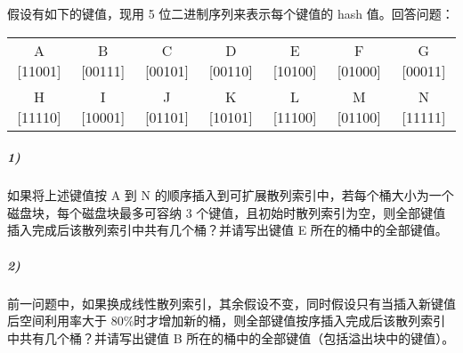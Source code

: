 \documentclass{article}
\makeatletter
\renewcommand{\section}{\@startsection{section}{1}{0mm}
                                {-5ex plus -.5ex minus -.2ex}
                                {3ex plus .2ex}
                                {\normalfont\large\bfseries}}
\makeatother
\begin{document}
\section{假设有如下的键值，现用 5 位二进制序列来表示每个键值的 hash 值。回答问题：}
\begin{table}[h]
    \centering
    \begin{tabular}{ccccccc}
        A [11001] & B [00111] & C [00101] & D [00110] & E [10100] & F [01000] & G [00011] \\
        H [11110] & I [10001] & J [01101] & K [10101] & L [11100] & M [01100] & N [11111]
    \end{tabular}
\end{table}
\subparagraph{1)} 如果将上述键值按 A 到 N 的顺序插入到可扩展散列索引中，若每个桶大小为一个磁盘块，每个磁盘块最多可容纳 3 个键值，且初始时散列索引为空，则全部键值插入完成后该散列索引中共有几个桶？并请写出键值 E 所在的桶中的全部键值。
\subparagraph{2)} 前一问题中，如果换成线性散列索引，其余假设不变，同时假设只有当插入新键值后空间利用率大于 80\%时才增加新的桶，则全部键值按序插入完成后该散列索引中共有几个桶？并请写出键值 B 所在的桶中的全部键值（包括溢出块中的键值）。
\end{document}
